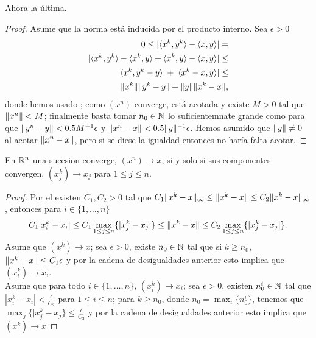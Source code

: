 Ahora la última.
\begin{proof}
    Asume que la norma está inducida por el producto interno. Sea $\epsilon >0$ 
    \begin{align*}
      0\leq|\langle x^k,y^k\rangle-\langle x,y\rangle|=\\
      |\langle x^k,y^k\rangle-\langle x^k,y\rangle+\langle x^k,y\rangle-\langle x,y\rangle|\leq\\
      |\langle x^k,y^k-y\rangle|+|\langle x^k-x,y\rangle|\leq\\
      \lVert x^k\rVert\lVert y^k-y\rVert+\lVert y\rVert\lVert x^k-x\rVert,
    \end{align*}
    donde hemos usado ;
    como $(x^n)$ converge, está acotada y existe $M>0$ tal que $\lVert x^n\rVert<M$; finalmente basta tomar $n_0 \in \mathbb{N}$ lo suficientemnate grande como para que $\lVert y^n-y\rVert<0.5 M^{-1}\epsilon $ y $\lVert x^n-x\rVert<0.5\lVert y\rVert^{-1} \epsilon $.
Hemos asumido que $\lVert y\rVert \neq 0$ al acotar $\lVert x^n-x\rVert$, pero si se diese la igualdad entonces no haría falta acotar.
\end{proof}
\begin{lemma}
  En $\mathbb{R}^n$ una sucesion converge, $(x^n)\to x$, si y solo si sus componentes convergen, $(x^k_j)\to x_j$ para $1\leq j\leq n$.
\end{lemma}
\begin{proof}
  Por el  existen $C_1,C_2>0$ tal que $C_1\lVert x^k-x\rVert_\infty\le \lVert x^k-x\rVert\le C_2\lVert x^k-x\rVert_\infty$, entonces para $i\in \{1,\ldots,n\} $ \[
  C_1|x_i^k-x_i| \le C_1\max_{1\leq j\leq n}\{|x_j^k-x_j|\} \le \lVert x^k-x\rVert\le C_2\max_{1\leq j\leq n}\{|x_j^k-x_j|\}.
  \]
  Asume que $(x^k)\to x$; sea $\epsilon>0$, existe $n_0\in \mathbb{N}$ tal que si $k \ge n_0$, $\lVert x^k-x\rVert \le C_1\epsilon$ y por la cadena de desigualdades anterior esto implica que $(x_i^k)\to x_i$.\\
  Asume que para todo $i\in \{1,\ldots,n\}$, $(x_i^k)\to x_i$; sea $\epsilon >0$, existen $n_0^i \in \mathbb{N}$ tal que $|x_i^k-x_i|<\frac{\epsilon }{C_2}$ para $1 \leq i \leq n$; para $k \geq n_0$, donde $n_0=\max_{i} \{n_0^i\}$, tenemos que $\max_{j} \{|x_j^k-x_j\} \leq \frac{\epsilon }{C_2}$ y por la cadena de desigualdades anterior esto implica que $(x^k)\to x$ 
\end{proof}
